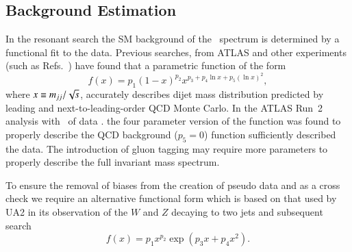 \subsection{Background Estimation}

In the resonant search the SM background of the \mjj\ spectrum is determined by a functional fit to the data.
Previous searches, from ATLAS and other experiments (such as Refs.~\cite{Bagnaia:1984ip,PhysRevD.79.112002,EXOT-2010-01,CMS-EXO-10-010,EXOT-2010-07,EXOT-2013-11})
have found that a parametric function of the form
\begin{equation}
  f(x) = p_1 (1 - x)^{p_2} x^{p_3 + p_4\ln x + p_5 (\ln x)^2},
\end{equation}
where $x \equiv m_{jj} /\sqrt{s}$, accurately describes dijet mass distribution predicted by leading and next-to-leading-order 
QCD Monte Carlo. In the ATLAS Run~2 analysis with \integLumi\ of data  \cite{EXOT-2019-03,Nishu:2646455}. the four parameter 
version of the function was found to properly describe the QCD background ($p_5 = 0$) function sufficiently described the data.  
The introduction of  gluon tagging may require more  parameters to properly describe the full invariant mass spectrum.

To ensure the removal of biases from the creation of pseudo data and as a cross check we require an alternative functional 
form which is based on that used by UA2 \cite{Alitti:1990kw, Alitti:1993pn} in its observation of the $W$ and $Z$ decaying 
to two jets and subsequent search
\begin{equation}
  f(x) = p_1 x^{p_2} \exp\left({p_3 x + p_4  x^2 }\right).
\end{equation}
